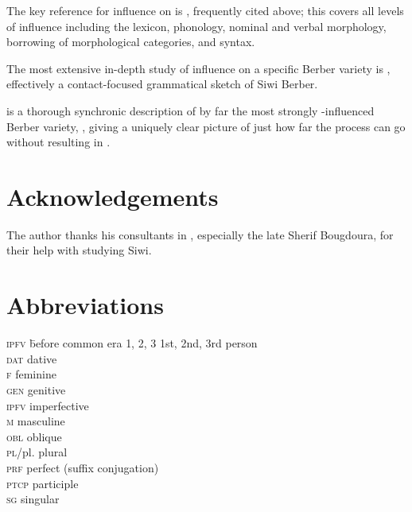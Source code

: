 \documentclass[output=paper]{langsci/langscibook}
\begin{document}
The key reference for  influence on  is \citet{Kossmann2012}, frequently cited above; this covers all levels of influence including the lexicon, phonology, nominal and verbal morphology, borrowing of morphological categories, and syntax.
\largerpage

The most extensive in-depth study of  influence on a specific Berber variety is \citet{Souag2013book}, effectively a contact-focused grammatical sketch of Siwi Berber.

\citet{Mourigh2016} is a thorough synchronic description of by far the most strongly -influenced Berber variety, , giving a uniquely clear picture of just how far the process can go without resulting in .

\section*{Acknowledgements}

The author thanks his consultants in , especially the late Sherif Bougdoura, for their help with studying Siwi.

\section*{Abbreviations}
\begin{multicols}{2}
\begin{tabbing}
\textsc{ipfv} \hspace{1em} \= before common era\kill
\textsc{1, 2, 3} \> 1st, 2nd, 3rd person \\
\textsc{dat} \> dative \\
\textsc{f} \> feminine \\
\textsc{gen} \> genitive \\
\textsc{ipfv} \> imperfective  \\
\textsc{m} \> masculine \\
\textsc{obl} \> oblique \\
\textsc{pl}/pl. \> plural \\
\textsc{prf} \> perfect (suffix conjugation) \\
\textsc{ptcp} \> {participle} \\
\textsc{sg} \> singular
\end{tabbing}
\end{multicols}

\sloppy
\printbibliography[heading=subbibliography,notkeyword=this]
\end{document}
